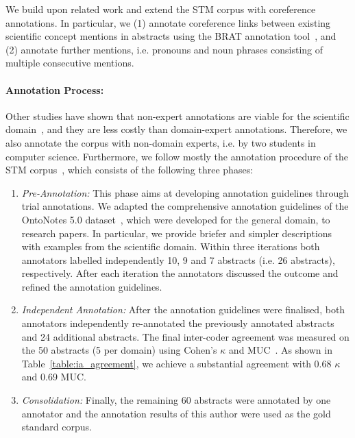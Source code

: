 \documentclass[runningheads]{llncs}
\begin{document}
We build upon related work and extend the STM corpus with coreference annotations. In particular, we (1) annotate coreference links between existing scientific concept mentions in abstracts using the BRAT annotation tool~\cite{StenetorpPTOAT12BRAT}, and (2) annotate further mentions, i.e. pronouns and noun phrases consisting of multiple consecutive mentions.

\paragraph{Annotation Process:}
Other studies have shown that non-expert annotations are viable for the scientific domain~\cite{Brack2020DomainindependentEO,Chambers2013,Fisas2015OnTD,SchaferSS12CorefACL,teufel2009towards}, 
and they are less costly than domain-expert annotations.
Therefore, we also annotate the corpus with non-domain experts, i.e. by two students in computer science.
Furthermore, we follow mostly the annotation procedure of the STM corpus~\cite{Brack2020DomainindependentEO}, which consists of the following three phases:
\begin{enumerate}[nosep]

\item \emph{Pre-Annotation:}
This phase aims at developing annotation guidelines through trial annotations.
We adapted the comprehensive annotation guidelines of the OntoNotes 5.0 dataset~\cite{PradhanCoNLL2012}, which were developed for the general domain, to research papers. 
In particular, we provide briefer and simpler descriptions with examples from the scientific domain.
Within three iterations both annotators labelled independently 10, 9 and 7 abstracts (i.e. 26 abstracts), respectively.
After each iteration the annotators discussed the outcome and refined the annotation guidelines.



\item \emph{Independent Annotation:}
After the annotation guidelines were finalised, both annotators independently re-annotated  the previously annotated abstracts and 24 additional abstracts. 
The final inter-coder agreement was measured on the 50 abstracts (5 per domain) using Cohen's $\kappa$ \cite{cohen1960coefficient,Kopec2014} and MUC~\cite{VilainBACH95MUC}.
As shown in Table~\ref{table:ia_agreement}, we achieve a substantial agreement with 0.68 $\kappa$ and 0.69 MUC. 


\item \emph{Consolidation:}
Finally, the remaining 60 abstracts were annotated by one annotator and the annotation results of this author were used as the gold standard corpus. 

\end{enumerate}
\end{document}
